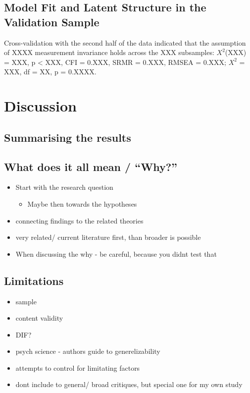 \documentclass[
  12pt,
  a4paper,
  twoside]{article}
\providecommand{\tightlist}{%
  \setlength{\itemsep}{0pt}\setlength{\parskip}{0pt}}
\begin{document}
\subsection{Model Fit and Latent Structure in the Validation Sample}\label{model-fit-and-latent-structure-in-the-validation-sample}

Cross-validation with the second half of the data indicated that the assumption of XXXX measurement invariance holds across the XXX subsamples: \(X^{2}\)(XXX) = XXX, p \textless{} XXX, CFI = 0.XXX, SRMR = 0.XXX, RMSEA = 0.XXX; \(X^{2}\) = XXX, df = XX, p = 0.XXXX.

\section{Discussion}\label{discussion}

\subsection{Summarising the results}\label{summarising-the-results}

\subsection{What does it all mean / ``Why?''}\label{what-does-it-all-mean-why}

\begin{itemize}
\tightlist
\item
  Start with the research question

  \begin{itemize}
  \tightlist
  \item
    Maybe then towards the hypotheses
  \end{itemize}
\item
  connecting findings to the related theories
\item
  very related/ current literature first, than broader is possible
\item
  When discussing the why - be careful, because you didnt test that
\end{itemize}

\subsection{Limitations}\label{limitations}

\begin{itemize}
\tightlist
\item
  sample
\item
  content validity
\item
  DIF?
\item
  psych science - authors guide to generelizability
\item
  attempts to control for limitating factors
\item
  dont include to general/ broad critiques, but special one for my own study
\end{itemize}
\end{document}
